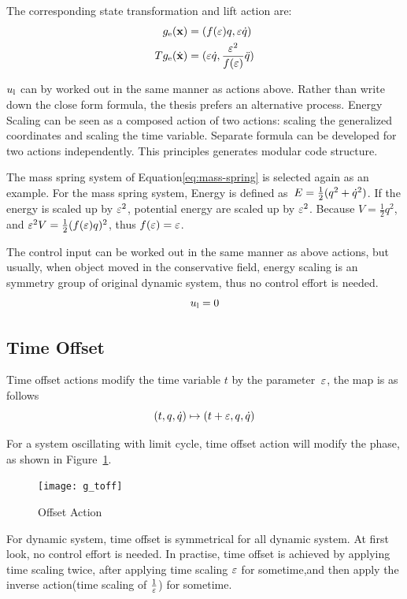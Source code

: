 The corresponding  state transformation and lift action are:
\begin{align}
g_{\mathrm{e}}(\mathbf{x})&=(f(\varepsilon) q,\varepsilon \dot{q}) \nonumber\\
Tg_{\mathrm{e}}(\dot{\mathbf{x}})&=(\varepsilon \dot{q},\frac{\varepsilon^2}{f(\varepsilon)}\ddot{q})
\end{align}

$u_{\mathrm{l}}$ can by worked out in the same manner as actions above.
Rather than write down the close form formula, the thesis prefers an alternative process.
Energy Scaling can be seen as a composed action of two actions: scaling the generalized coordinates and scaling the time variable.
Separate formula can be developed for two actions independently.
This principles generates modular code structure.




The mass spring system of Equation\ref{eq:mass-spring} is selected again as an example.
 For the mass spring system, Energy is defined as~$E=\frac{1}{2}(q^2+\dot{q}^2)$.
 If the energy is scaled up by $\varepsilon^2$,  potential energy are scaled up by $\varepsilon^2$.
 Because $V= \frac{1}{2}q^2$, and $\varepsilon^2 V=\frac{1}{2}(f(\varepsilon)q)^2$, thus $f(\varepsilon)=\varepsilon$.
 
 
The control input can be worked out in the same manner as above actions, but usually, when object moved in the conservative field, energy scaling is an symmetry group of original dynamic system, thus no control effort is needed.
\[
u_{\mathrm{l}}=0
\]



\subsection*{Time Offset}

Time offset actions modify the time  variable $t$ by the parameter~$\varepsilon$, the map is as follows
\[
(t,q,\dot{q}) \mapsto (t+\varepsilon,q,\dot{q})
\]


For a system oscillating with limit cycle, time offset action will modify the phase, as shown in Figure~\ref{fig:gtoff}.
\begin{figure}
  \begin{center}
      \texttt{[image: g\_toff]}
    \caption{Offset Action}
    \label{fig:gtoff}
\end{center}
\end{figure}

For dynamic system, time offset is symmetrical for all dynamic system.
At first look, no control effort is needed.
In practise, time offset is achieved by applying time scaling twice, after applying time scaling $\varepsilon$ for sometime,and then apply the inverse action(time scaling of $\frac{1}{\varepsilon}$) for sometime.



